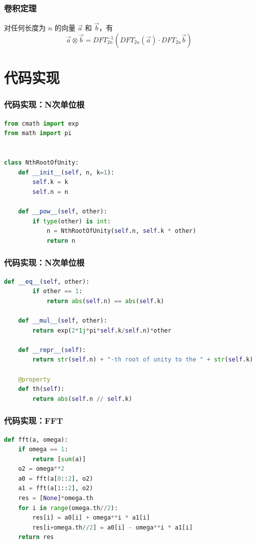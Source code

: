 \documentclass[UTF8]{ctexbeamer}
\begin{document}
\begin{frame}
    \frametitle{卷积定理}
    对任何长度为 $n$ 的向量 $\vec{a}$ 和 $\vec{b}$，有
    $$\vec{a} \otimes \vec{b} = DFT_{2n}^{-1}(DFT_{2n}(\vec{a}) · DFT_{2n}{\vec{b}})$$
\end{frame}

\section{代码实现}

\begin{frame}[fragile]
    \frametitle{代码实现：N次单位根}
    \begin{lstlisting}[language=Python]
from cmath import exp
from math import pi


class NthRootOfUnity:
    def __init__(self, n, k=1):
        self.k = k
        self.n = n

    def __pow__(self, other):
        if type(other) is int:
            n = NthRootOfUnity(self.n, self.k * other)
            return n
    \end{lstlisting}
\end{frame}

\begin{frame}[fragile]
    \frametitle{代码实现：N次单位根}
    \begin{lstlisting}[language=Python] 
    def __eq__(self, other):
        if other == 1:
            return abs(self.n) == abs(self.k)

    def __mul__(self, other):
        return exp(2*1j*pi*self.k/self.n)*other

    def __repr__(self):
        return str(self.n) + "-th root of unity to the " + str(self.k)

    @property
    def th(self):
        return abs(self.n // self.k)
    \end{lstlisting}
\end{frame}

\begin{frame}[fragile]
    \frametitle{代码实现：FFT}
    \begin{lstlisting}[language=Python] 
def fft(a, omega):
    if omega == 1:
        return [sum(a)]
    o2 = omega**2
    a0 = fft(a[0::2], o2)
    a1 = fft(a[1::2], o2)
    res = [None]*omega.th
    for i in range(omega.th//2):
        res[i] = a0[i] + omega**i * a1[i]
        res[i+omega.th//2] = a0[i] - omega**i * a1[i]
    return res
    \end{lstlisting}
\end{frame}
\end{document}
